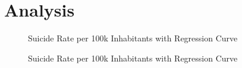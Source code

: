 \section{Analysis}

\begin{figure}
    \centering
    \caption{Suicide Rate per 100k Inhabitants with Regression Curve}
    \label{fig:regression-curve}
\end{figure}

\begin{figure}
    \centering
    \caption{Suicide Rate per 100k Inhabitants with Regression Curve}
    \label{fig:another-regression-curve}
\end{figure}

